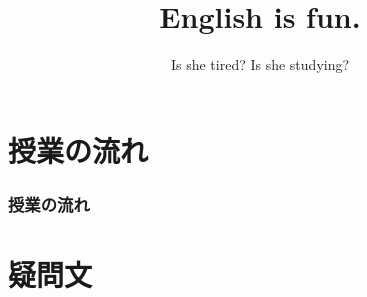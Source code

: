 \documentclass[aspectratio=169,xcolor={dvipsnames,table}]{beamer}
\title{English is fun.}
\subtitle{Is she tired? Is she studying?}
\author{}
\institute[]{}
\date[]
\begin{document}
\begin{frame}[plain]
  \titlepage
\end{frame}


\section*{授業の流れ}
\begin{frame}[plain]
  \frametitle{授業の流れ}
  \tableofcontents
\end{frame}



\section{疑問文}

\end{document}
